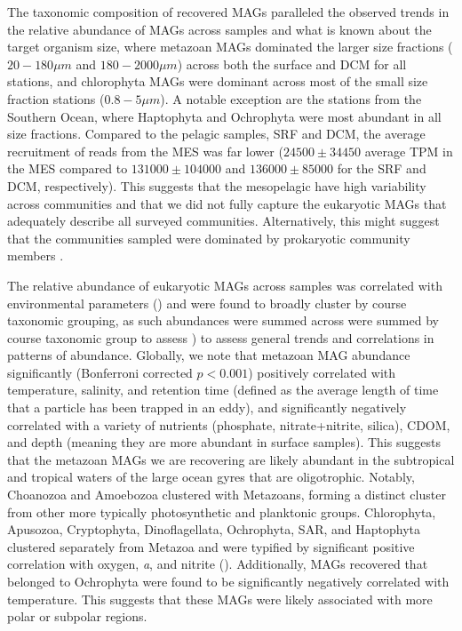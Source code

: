 \documentclass[12pt]{article}
\numberwithin{equation}{section}
\begin{document}
The taxonomic composition of recovered MAGs paralleled the observed trends in the relative abundance of MAGs across samples and what is known about the target organism size, where metazoan MAGs dominated the larger size fractions ($20-180 \mu m$ and $180-2000 \mu m$) across both the surface and DCM for all stations, and chlorophyta MAGs were dominant across most of the small size fraction stations ($0.8-5 \mu m$). A notable exception are the stations from the Southern Ocean, where Haptophyta and Ochrophyta were most abundant in all size fractions. Compared to the pelagic samples, SRF and DCM, the average recruitment of reads from the MES was far lower ($24500 \pm 34450$ average TPM in the MES compared to $131000 \pm 104000 $ and $136000 \pm 85000$ for the SRF and DCM, respectively). This suggests that the mesopelagic have high variability across communities \citep{Pernice_2015} and that we did not fully capture the eukaryotic MAGs that adequately describe all surveyed communities. Alternatively, this might suggest that the communities sampled were dominated by prokaryotic community members \citep{Pernice_2014}.  

The relative abundance of eukaryotic MAGs across samples was correlated with environmental parameters () and were found to broadly cluster by course taxonomic grouping, as such abundances were summed across were summed by course taxonomic group to assess  ) to assess general trends and correlations in patterns of abundance. Globally, we note that metazoan MAG abundance significantly (Bonferroni corrected $p<0.001$) positively correlated with temperature, salinity, and retention time (defined as the average length of time that a particle has been trapped in an eddy), and significantly negatively correlated with a variety of nutrients (phosphate, nitrate+nitrite, silica), CDOM, and depth (meaning they are more abundant in surface samples). This suggests that the metazoan MAGs we are recovering are likely abundant in the subtropical and tropical waters of the large ocean gyres that are oligotrophic. Notably, Choanozoa and Amoebozoa clustered with Metazoans, forming a distinct cluster from other more typically photosynthetic and planktonic groups. Chlorophyta, Apusozoa, Cryptophyta, Dinoflagellata, Ochrophyta, SAR, and Haptophyta clustered separately from Metazoa and were typified by significant positive correlation with oxygen, \textit{a}, and nitrite (). Additionally, MAGs recovered that belonged to Ochrophyta were found to be significantly negatively correlated with temperature. This suggests that these MAGs were likely associated with more polar or subpolar regions.
\end{document}
